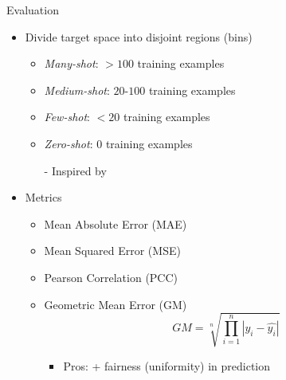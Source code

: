 \begin{frame}{Evaluation}
	\begin{itemize}\setlength\itemsep{1.5em}
		\item Divide target space into disjoint regions (bins)
		\begin{itemize}
			\item \emph{Many-shot}: $>100$ training examples
			\item \emph{Medium-shot}: $20$-$100$ training examples
			\item \emph{Few-shot}: $<20$ training examples
			\item \emph{Zero-shot}: $0$ training examples
			\item[-] Inspired by \cite{liu2019large}
		\end{itemize}
		\item Metrics
		\begin{itemize}
			\item Mean Absolute Error (MAE)
			\item Mean Squared Error (MSE)
			\item Pearson Correlation (PCC)
			\item Geometric Mean Error (GM)
			\begin{equation*}
				GM = \sqrt[n]{\prod_{i=1}^n |y_i - \hat{y_i}|}
			\end{equation*}
			\begin{itemize}
				\item Pros: + fairness (uniformity) in prediction
			\end{itemize}
		\end{itemize}
	\end{itemize}
\end{frame}